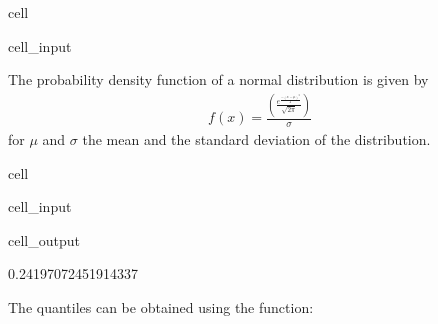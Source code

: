 \documentclass[letterpaper,10pt,english]{jupyterBook}
\begin{document}
\begin{sphinxuseclass}{cell}\begin{sphinxVerbatimInput}

\begin{sphinxuseclass}{cell_input}
\begin{sphinxVerbatim}[commandchars=\\\{\}]
\end{sphinxVerbatim}

\end{sphinxuseclass}\end{sphinxVerbatimInput}

\end{sphinxuseclass}
\sphinxAtStartPar
The probability density function of a normal distribution is given by
\begin{equation*}
\begin{split}f(x) = \frac{(\frac{e^{\frac{-(x-\mu)^2}{2}}}{\sqrt{2\pi}})}{\sigma}\end{split}
\end{equation*}
\sphinxAtStartPar
for \(\mu\) and \(\sigma\) the mean and the standard deviation of the distribution.

\begin{sphinxuseclass}{cell}\begin{sphinxVerbatimInput}

\begin{sphinxuseclass}{cell_input}
\begin{sphinxVerbatim}[commandchars=\\\{\}]
    
  
\end{sphinxVerbatim}

\end{sphinxuseclass}\end{sphinxVerbatimInput}
\begin{sphinxVerbatimOutput}

\begin{sphinxuseclass}{cell_output}
\begin{sphinxVerbatim}[commandchars=\\\{\}]
0.24197072451914337
\end{sphinxVerbatim}

\end{sphinxuseclass}\end{sphinxVerbatimOutput}

\end{sphinxuseclass}
\sphinxAtStartPar
The quantiles can be obtained using the  function:
\end{document}

